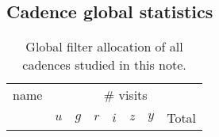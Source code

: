 \begin{appendices}
    
\section{Cadence global statistics}
\label{sec:globalstat}

\begin{longtable}{l|ccccccc}
    \caption{Global filter allocation of all cadences studied in this note.}\label{tab:global_cadence_stats} \\
    \hline
    \hline    
  name & \multicolumn{7}{c}{\# visits} \\
       & $u$ & $g$ & $r$ & $i$ & $z$ & $y$ & Total \\


\end{longtable}
\end{appendices}
